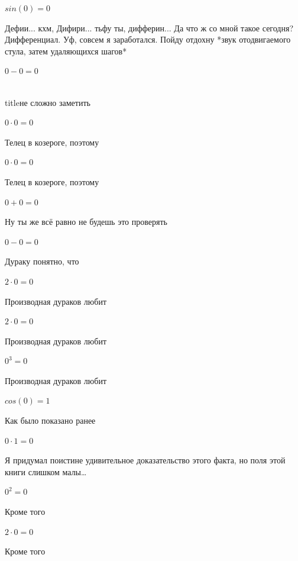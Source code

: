 \documentclass[12pt,a4paper,fleqn]{article}
\begin{document}
\begin{center}$sin(0) = 0$\end{center}
Дефии... кхм, Дифири... тьфу ты, дифферин... Да что ж со мной такое сегодня? Дифференциал. Уф, совсем я заработался. Пойду отдохну *звук отодвигаемого стула, затем удаляющихся шагов*

\begin{center}$0-0 = 0$\end{center}
\\ title{не сложно заметить} 

\begin{center}$0 \cdot 0 = 0$\end{center}
Телец в козероге, поэтому

\begin{center}$0 \cdot 0 = 0$\end{center}
Телец в козероге, поэтому

\begin{center}$0+0 = 0$\end{center}
Ну ты же всё равно не будешь это проверять

\begin{center}$0-0 = 0$\end{center}
Дураку понятно, что

\begin{center}$2 \cdot 0 = 0$\end{center}
Производная дураков любит\cite{link2}

\begin{center}$2 \cdot 0 = 0$\end{center}
Производная дураков любит\cite{link2}

\begin{center}$0^{3} = 0$\end{center}
Производная дураков любит\cite{link2}

\begin{center}$cos(0) = 1$\end{center}
Как было показано ранее

\begin{center}$0 \cdot 1 = 0$\end{center}
Я придумал поистине удивительное доказательство этого факта, но поля этой книги слишком малы\ldots

\begin{center}$0^{2} = 0$\end{center}
Кроме того

\begin{center}$2 \cdot 0 = 0$\end{center}
Кроме того
\end{document}

